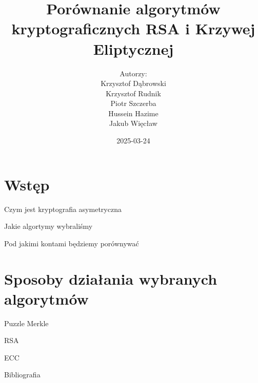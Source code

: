 \documentclass{beamer}
\title{Porównanie algorytmów kryptograficznych RSA i Krzywej Eliptycznej}
\author{Autorzy:\\ Krzysztof Dąbrowski\\ Krzysztof Rudnik\\ Piotr Szczerba\\ Hussein Hazime\\ Jakub Więcław}
\date{2025-03-24}
\begin{document}
\begin{frame}
    \titlepage
\end{frame}

\section{Wstęp}
\begin{frame}{Czym jest kryptografia asymetryczna}
\end{frame}

\begin{frame}{Jakie algortymy wybraliśmy}

\end{frame}
\begin{frame}{Pod jakimi kontami będziemy porównywać}

\end{frame}

\section{Sposoby działania wybranych algorytmów}
\begin{frame}{Puzzle Merkle} %

\end{frame}


\begin{frame}{RSA}

\end{frame}



\begin{frame}{ECC}

\end{frame}









\begin{frame}{Bibliografia}
\printbibliography
\end{frame}
\end{document}
